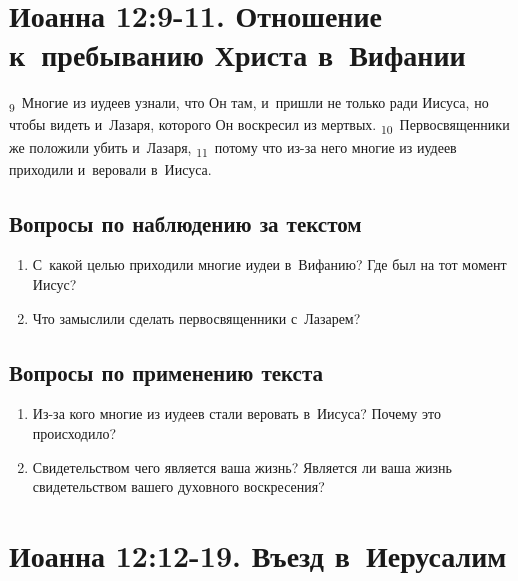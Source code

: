 \documentclass[a4paper,12pt]{article}
\begin{document}

\section{Иоанна 12:9-11. Отношение к~пребыванию Христа в~Вифании}

\textsubscript{9}~Многие из иудеев узнали, что Он там, и~пришли не только ради Иисуса, но чтобы видеть и~Лазаря, которого Он воскресил из мертвых.
\textsubscript{10}~Первосвященники же положили убить и~Лазаря,
\textsubscript{11}~потому что из-за него многие из иудеев приходили и~веровали в~Иисуса.

\subsection*{Вопросы по наблюдению за текстом}
\begin{enumerate}
    \item С~какой целью приходили многие иудеи в~Вифанию? Где был на тот момент Иисус? 
    
    \myline
    
    \myline
    \item Что замыслили сделать первосвященники с~Лазарем? 
    
    \myline
    
    \myline
\end{enumerate}

\subsection*{Вопросы по применению текста} 
\begin{enumerate}
    \item Из-за кого многие из иудеев стали веровать в~Иисуса? Почему это происходило? 
    
    \myline
    
    \myline
    \item Свидетельством чего является ваша жизнь? Является ли ваша жизнь свидетельством вашего духовного воскресения? 
    
    \myline
    
    \myline
\end{enumerate}



\section{Иоанна 12:12-19. Въезд в~Иерусалим}
\end{document}

